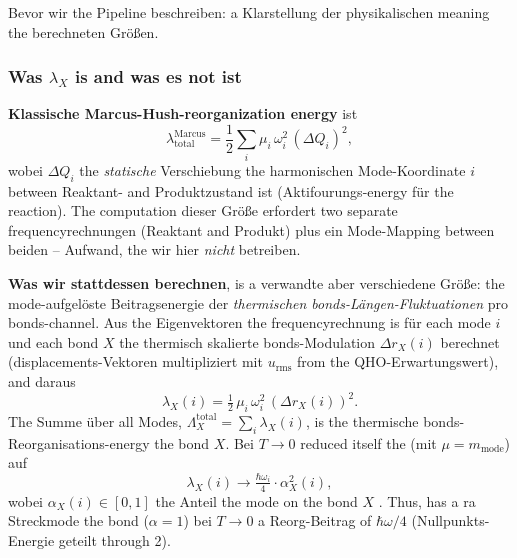 \documentclass[11pt,a4paper,twoside]{article}
\theoremstyle{remark}
\begin{document}
Bevor wir the Pipeline beschreiben: a Klarstellung der
physikalischen meaning the berechneten Gr\"o{\ss}en.

\subsubsection*{Was $\lambda_X$ is and was es not ist}

\textbf{Klassische Marcus-Hush-reorganization energy}
\cite{Marcus1956,Marcus1993} ist
\begin{equation}
  \lambda^{\text{Marcus}}_\text{total}
  = \frac{1}{2}\sum_i \mu_i\,\omega_i^2\,(\Delta Q_i)^2,
  \label{eq:marcus-hush}
\end{equation}
wobei $\Delta Q_i$ the \emph{statische} Verschiebung the harmonischen
Mode-Koordinate $i$ between Reaktant- and Produktzustand ist
(Aktifourungs-energy f\"ur the reaction). The computation dieser Gr\"o{\ss}e
erfordert two separate frequencyrechnungen (Reaktant and Produkt) plus
ein Mode-Mapping between beiden -- Aufwand, the wir hier
\emph{nicht} betreiben.

\textbf{Was wir stattdessen berechnen}, is a verwandte aber
verschiedene Gr\"o{\ss}e: the mode-aufgel\"oste Beitragsenergie der
\emph{thermischen bonds-L\"angen-Fluktuationen} pro bonds-channel.
Aus the Eigenvektoren the frequencyrechnung is f\"ur each mode $i$
und each bond $X$ the thermisch skalierte bonds-Modulation
$\Delta r_X(i)$ berechnet (displacements-Vektoren multipliziert mit
$u_\text{rms}$ from the QHO-Erwartungswert), and daraus
\begin{equation}
  \lambda_X(i) = \tfrac{1}{2}\,\mu_i\,\omega_i^2\,(\Delta r_X(i))^2.
  \label{eq:lambda-mode}
\end{equation}
The Summe \"uber all Modes,
$\Lambda_X^\text{total} = \sum_i \lambda_X(i)$, is the thermische
bonds-Reorganisations-energy the bond $X$. Bei $T \to 0$
reduced itself the (mit $\mu = m_\text{mode}$) auf
\begin{equation}
  \lambda_X(i) \to \tfrac{\hbar\omega_i}{4} \cdot \alpha_X^2(i),
\end{equation}
wobei $\alpha_X(i) \in [0, 1]$ the Anteil the mode on the bond $X$
. Thus, has a ra Streckmode the bond ($\alpha = 1$) bei
$T \to 0$ a Reorg-Beitrag of $\hbar\omega/4$ (Nullpunkts-Energie
geteilt through 2).
\end{document}
